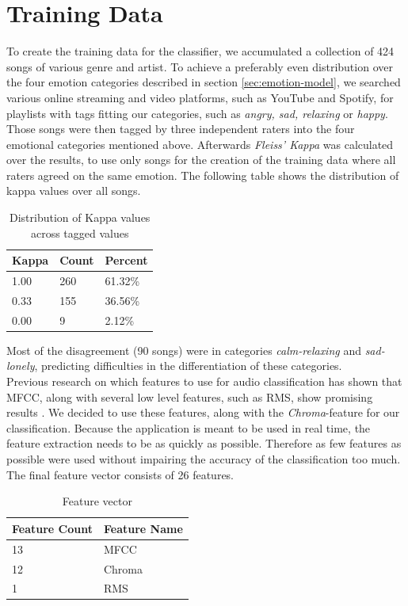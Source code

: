 \documentclass{sigchi-ext}
\begin{document}
\section{Training Data}\label{training-data}
To create the training data for the classifier, we accumulated a collection of 424 songs of various genre and artist. To achieve a preferably even distribution over the four emotion categories described in section \ref{sec:emotion-model}, we searched various online streaming and video platforms, such as YouTube and Spotify, for playlists with tags fitting our categories, such as \textit{angry, sad, relaxing} or \textit{happy}.\\
Those songs were then tagged by three independent raters into the four emotional categories mentioned above. Afterwards \textit{Fleiss' Kappa} was calculated over the results, to use only songs for the creation of the training data where all raters agreed on the same emotion. The following table shows the distribution of kappa values over all songs.\\

\begin{table}
  \centering
  \label{kappa-distribution}
  \begin{tabular}{@{}lll@{}}
    Kappa & Count & Percent \\ \midrule
    1.00 & 260 & 61.32\% \\
    0.33 & 155 & 36.56\% \\
    0.00 & 9 	 & 2.12\%
  \end{tabular}
  \caption{Distribution of Kappa values across tagged values}
\end{table}

Most of the disagreement (90 songs) were in categories \textit{calm-relaxing} and \textit{sad-lonely}, predicting difficulties in the differentiation of these categories.\\

Previous research on which features to use for audio classification has shown that MFCC, along with several low level features, such as RMS, show promising results \cite{Trohidis2011,Kim2010}. We decided to use these features, along with the \textit{Chroma}-feature for our classification. Because the application is meant to be used in real time, the feature extraction needs to be as quickly as possible. Therefore as few features as possible were used without impairing the accuracy of the classification too much. The final feature vector consists of 26 features.

\begin{table}
  \centering
  \begin{tabular}{@{}ll@{}}
    Feature Count & Feature Name \\ \midrule
    13 & MFCC \\
    12 & Chroma \\
    1  & RMS
  \end{tabular}
  \caption{Feature vector}
  \label{feature-vector}
\end{table}
\end{document}
